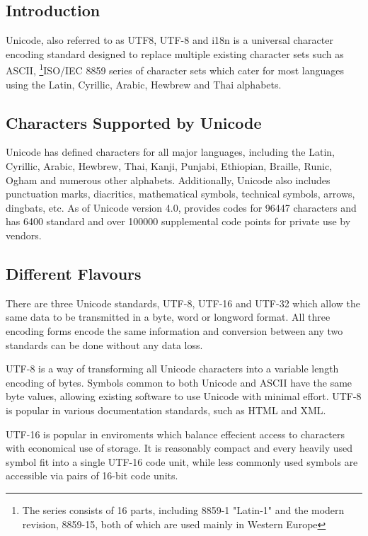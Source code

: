 
\subsection{Introduction}

Unicode, also referred to as UTF8, UTF-8 and i18n is a universal
character encoding standard designed to replace multiple existing
character sets such as ASCII, 
\footnote{The series consists of 16 parts, including 8859-1 "Latin-1" and the modern revision, 8859-15, both of which are used mainly in Western Europe}{ISO/IEC 8859 series} 
of character sets which cater for most languages using the Latin, 
Cyrillic, Arabic, Hewbrew and Thai alphabets.

\subsection{Characters Supported by Unicode}

Unicode has defined characters for all major languages, including the
Latin, Cyrillic, Arabic, Hewbrew, Thai, Kanji, Punjabi, Ethiopian, 
Braille, Runic, Ogham and numerous other alphabets. Additionally,
Unicode also includes punctuation marks, diacritics, mathematical
symbols, technical symbols, arrows, dingbats, etc. As of Unicode version
4.0, provides codes for 96447 characters and has 6400 standard and over
100000 supplemental code points for private use by vendors.

\subsection{Different Flavours}

There are three Unicode standards, UTF-8, UTF-16 and UTF-32 which allow 
the same data to be transmitted in a byte, word or longword format. All
three encoding forms encode the same information and conversion between
any two standards can be done without any data loss.


UTF-8 is a way of transforming all Unicode characters into a variable
length encoding of bytes. Symbols common to both Unicode and ASCII have
the same byte values, allowing existing software to use Unicode with
minimal effort. UTF-8 is popular in various documentation standards, 
such as HTML and XML.


UTF-16 is popular in enviroments which balance effecient access to
characters with economical use of storage. It is reasonably compact and
every heavily used symbol fit into a single UTF-16 code unit, while
less commonly used symbols are accessible via pairs of 16-bit code
units.


